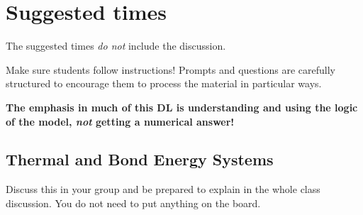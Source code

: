 {    \section*{Suggested times}
    	
    The suggested times {\em do not} include the \WC{} discussion.

    Make sure students follow instructions! Prompts and questions are carefully structured to encourage them to process the material in particular ways.

  \textbf{
    The emphasis in much of this DL is understanding and using the logic of the model, {\em not} getting a numerical answer!
	}
}     	

\subsection{Thermal and Bond Energy Systems}
\label{act1.2.2}

\begin{FNTenv}
	
\end{FNTenv}


\noindent Discuss this \FNT{} in your group and be prepared to explain in the whole class discussion. You do not need to put anything on the board.

\WCD

\begin{FNTenv}
	
\end{FNTenv}

